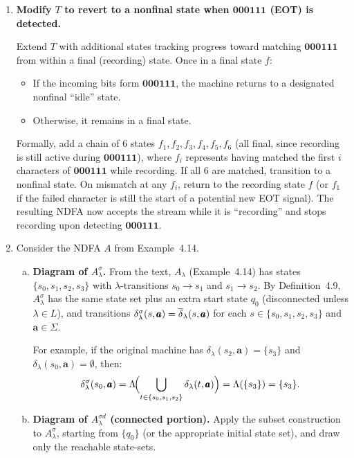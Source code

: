\begin{enumerate}[{4.}1.]
\item \textbf{Modify $T$ to revert to a nonfinal state when $\pmb{000111}$ (EOT) is detected.}

Extend $T$ with additional states tracking progress toward matching $\pmb{000111}$
from within a final (recording) state.  Once in a final state $f$:
\begin{itemize}
  \item If the incoming bits form $\pmb{000111}$, the machine returns to a
  designated nonfinal ``idle'' state.
  \item Otherwise, it remains in a final state.
\end{itemize}
Formally, add a chain of 6 states $f_1,f_2,f_3,f_4,f_5,f_6$ (all final, since
recording is still active during $\pmb{000111}$), where $f_i$ represents having
matched the first $i$ characters of $\pmb{000111}$ while recording.  If all 6
are matched, transition to a nonfinal state.  On mismatch at any $f_i$, return
to the recording state $f$ (or $f_1$ if the failed character is still the start
of a potential new EOT signal).  The resulting NDFA now accepts the stream
while it is ``recording'' and stops recording upon detecting $\pmb{000111}$.

\item Consider the NDFA $A$ from Example~4.14.

\begin{enumerate}[(a)]
  \item \textbf{Diagram of $A^{\sigma}_\lambda$.}
  From the text, $A_\lambda$ (Example~4.14) has states $\{s_0,s_1,s_2,s_3\}$
  with $\lambda$-transitions $s_0\to s_1$ and $s_1\to s_2$.  By Definition~4.9,
  $A^{\sigma}_\lambda$ has the same state set plus an extra start state $q_0$
  (disconnected unless $\lambda\in L$), and transitions
  $\delta^{\sigma}_\lambda(s,\pmb{a})=\overline{\delta}_\lambda(s,\pmb{a})$ for each
  $s\in\{s_0,s_1,s_2,s_3\}$ and $\pmb{a}\in\Sigma$.

  For example, if the original machine has $\delta_\lambda(s_2,\pmb{a})=\{s_3\}$
  and $\delta_\lambda(s_0,\pmb{a})=\emptyset$, then:
  \[
    \delta^{\sigma}_\lambda(s_0,\pmb{a})
    =\Lambda\!\Bigl(\bigcup_{t\in\{s_0,s_1,s_2\}}\delta_\lambda(t,\pmb{a})\Bigr)
    =\Lambda(\{s_3\})=\{s_3\}.
  \]

  \item \textbf{Diagram of $A^{\sigma d}_\lambda$ (connected portion).}
  Apply the subset construction to $A^{\sigma}_\lambda$, starting from
  $\{q_0\}$ (or the appropriate initial state set), and draw only the reachable
  state-sets.
\end{enumerate}


\end{enumerate}
